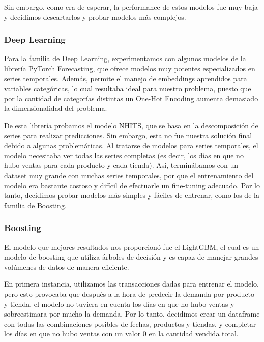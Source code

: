 \documentclass[12pt,a4paper]{article}
\begin{document}
        Sin embargo, como era de esperar, la performance de estos modelos fue muy baja y decidimos descartarlos y probar modelos más complejos.

        \subsubsection{Deep Learning}

        Para la familia de Deep Learning, experimentamos con algunos modelos de la librería PyTorch Forecasting, que ofrece modelos muy potentes especializados en series temporales. 
        Además, permite el manejo de embeddings aprendidos para variables categóricas, lo cual resultaba ideal para nuestro problema, puesto que por la cantidad de categorías distintas un One-Hot Encoding aumenta demasiado la dimensionalidad del problema.
        
        \vspace{0.2cm}

        De esta librería probamos el modelo NHITS, que se basa en la descomposición de series para realizar predicciones. Sin embargo, esta no fue nuestra solución final debido a algunas problemáticas. Al tratarse de modelos para series temporales, el modelo 
        necesitaba ver todas las series completas (es decir, los días en que no hubo ventas para 
        cada producto y cada tienda). Así, terminábamos con un dataset muy grande con muchas series temporales, por que el entrenamiento del modelo era bastante costoso y difícil de efectuarle un fine-tuning adecuado. 
        Por lo tanto, decidimos probar modelos más simples y fáciles de entrenar, como los de la familia de Boosting.
        \vspace{0.2cm}

        \subsubsection{Boosting}

        El modelo que mejores resultados nos proporcionó fue el LightGBM, el cual es un modelo de boosting que utiliza árboles de decisión y 
        es capaz de manejar grandes volúmenes de datos de manera eficiente.

        \vspace{0.2cm}

    En primera instancia, utilizamos las transacciones dadas para entrenar el modelo, pero esto provocaba que después a la hora de 
    predecir la demanda por producto y tienda, el modelo no tuviera en cuenta los días en que no hubo ventas y sobreestimara por mucho 
    la demanda. Por lo tanto, decidimos crear un dataframe con todas las combinaciones posibles de fechas, productos y tiendas, y completar 
    los días en que no hubo ventas con un valor 0 en la cantidad vendida total.
\end{document}
